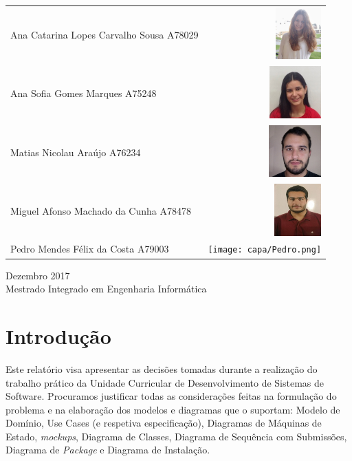 \documentclass[12pt,a4paper]{report}
\begin{document}
\begin{titlepage}
	\begin{table}[h]
	\raggedleft
		\label{my-label}
		\begin{tabular}{lr}
		Ana Catarina Lopes Carvalho Sousa A78029 & \includegraphics[height=2cm]{capa/Catarina.png} \\
		Ana Sofia Gomes Marques A75248           & \includegraphics[height=2cm]{capa/Sofia.png}    \\
		Matias Nicolau Araújo A76234             & \includegraphics[height=2cm]{capa/Matias.png}   \\
		Miguel Afonso Machado da Cunha A78478    & \includegraphics[height=2cm]{capa/Miguel.png}   \\
		Pedro Mendes Félix da Costa A79003       & \texttt{[image: capa/Pedro.png]}   \\
		\end{tabular}
	\end{table}
	\vfill

	Dezembro 2017\\
	Mestrado Integrado em Engenharia Informática
\end{titlepage}
\tableofcontents
\chapter{Introdução}

Este relatório visa apresentar as decisões tomadas durante a realização do
trabalho prático da Unidade Curricular de Desenvolvimento de Sistemas de Software.
Procuramos justificar todas as considerações feitas na formulação do problema e na elaboração dos modelos e diagramas que o suportam: Modelo de Domínio, Use Cases (e respetiva especificação), Diagramas de Máquinas de Estado, \emph{mockups}, Diagrama de Classes, Diagrama de Sequência com Submissões, Diagrama de \emph{Package} e Diagrama de Instalação.
\end{document}

